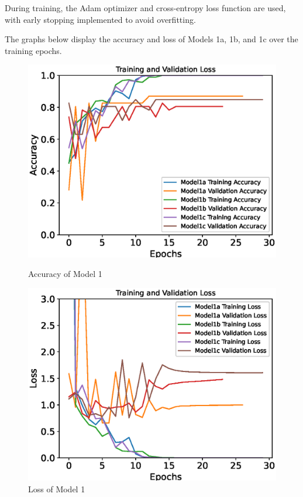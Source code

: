 During training, the Adam optimizer and cross-entropy loss function are used, with early stopping implemented to avoid overfitting.

The graphs below display the accuracy and loss of Models 1a, 1b, and 1c over the training epochs.

\begin{figure}[H]
    \centering
    \begin{minipage}{0.49\textwidth}
        \centering
        \includegraphics[width=\textwidth]{./fig/model1/accuracy11.eps}
        \caption{Accuracy of Model 1}
        \label{fig:model11_acc}
    \end{minipage}
    \begin{minipage}{0.49\textwidth}
        \centering
        \includegraphics[width=\textwidth]{./fig/model1/loss11.eps}
        \caption{Loss of Model 1}
        \label{fig:model11_loss}
    \end{minipage}
\end{figure}


